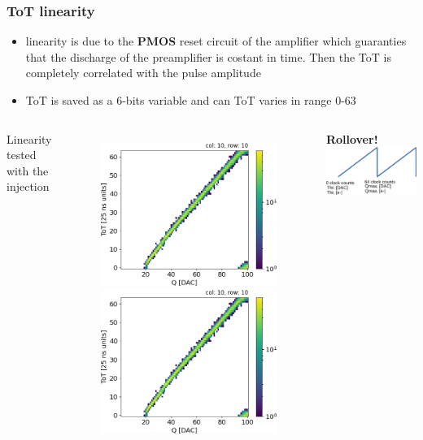     \begin{frame}
        \frametitle{ToT linearity}
        \begin{itemize}
            \item linearity is due to the \textbf{PMOS} reset circuit of the amplifier which guaranties that the discharge of the preamplifier is costant in time. Then the ToT is completely correlated with the pulse amplitude 
            \item ToT is saved as a 6-bits variable and can ToT varies in range 0-63
        \end{itemize}
        \medskip
        \medskip
        \medskip
        \begin{columns}
                \centering
                Linearity tested with the injection
                \begin{figure}[h!]
                    \includegraphics[width=.49\linewidth]{figures/charaterization/ToT_rollover.png}
                    \includegraphics[width=.49\linewidth]{figures/charaterization/ToT_rollover.png} 
                \end{figure}
                \centering\textbf{Rollover!}\\
                \smallskip
                \includegraphics[width=.99\linewidth]{figures/Monopix1/rollover.pdf} 

\end{columns}
\end{frame}
